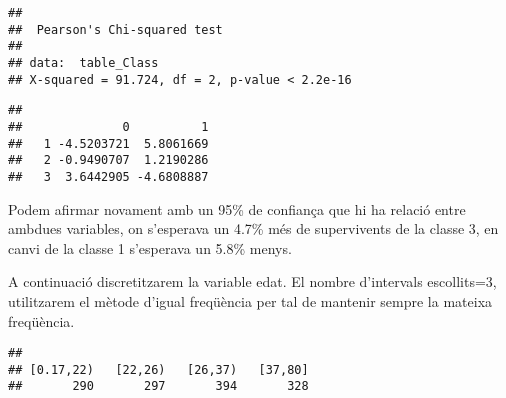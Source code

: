 \documentclass[]{article}
\newenvironment{Shaded}{\begin{snugshade}}{\end{snugshade}}
\newcommand{\DataTypeTok}[1]{\textcolor[rgb]{0.13,0.29,0.53}{#1}}
\newcommand{\DecValTok}[1]{\textcolor[rgb]{0.00,0.00,0.81}{#1}}
\newcommand{\KeywordTok}[1]{\textcolor[rgb]{0.13,0.29,0.53}{\textbf{#1}}}
\newcommand{\NormalTok}[1]{#1}
\newcommand{\OperatorTok}[1]{\textcolor[rgb]{0.81,0.36,0.00}{\textbf{#1}}}
\newcommand{\OtherTok}[1]{\textcolor[rgb]{0.56,0.35,0.01}{#1}}
\newcommand{\StringTok}[1]{\textcolor[rgb]{0.31,0.60,0.02}{#1}}
\begin{document}
\begin{verbatim}
## 
##  Pearson's Chi-squared test
## 
## data:  table_Class
## X-squared = 91.724, df = 2, p-value < 2.2e-16
\end{verbatim}

\begin{Shaded}
\end{Shaded}

\begin{verbatim}
##    
##              0          1
##   1 -4.5203721  5.8061669
##   2 -0.9490707  1.2190286
##   3  3.6442905 -4.6808887
\end{verbatim}

Podem afirmar novament amb un 95\% de confiança que hi ha relació entre
ambdues variables, on s'esperava un 4.7\% més de supervivents de la
classe 3, en canvi de la classe 1 s'esperava un 5.8\% menys.

A continuació discretitzarem la variable edat. El nombre d'intervals
escollits=3, utilitzarem el mètode d'igual freqüència per tal de
mantenir sempre la mateixa freqüència.

\begin{Shaded}
\end{Shaded}

\begin{verbatim}
## 
## [0.17,22)   [22,26)   [26,37)   [37,80] 
##       290       297       394       328
\end{verbatim}
\end{document}
